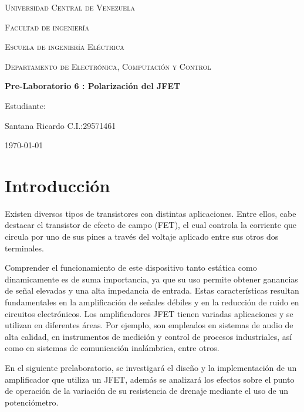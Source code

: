 \documentclass[12pt, a4paper]{article}
\begin{document}
    \begin{titlepage}
        \centering
        {\scshape\Large Universidad Central de Venezuela \par}
        {\scshape\Large Facultad de ingeniería \par}
        {\scshape\Large Escuela de ingeniería Eléctrica \par}
        {\scshape\Large Departamento de Electrónica, Computación y Control \par}

        \vspace{6cm}
        {\Large\bfseries Pre-Laboratorio 6 : Polarización del JFET\par}
        \vspace{6cm}

        \vfill
        \begin{flushright}
            Estudiante:\par
            Santana Ricardo C.I.:29571461 \par
            \vspace{1cm}  
        \end{flushright}
        \vfill
        {\large \today \par}
    \end{titlepage}

    \section{Introducción}

    Existen diversos tipos de transistores con distintas aplicaciones. Entre ellos, cabe destacar el transistor de efecto de campo (FET), el cual controla la corriente que circula por uno de sus pines a través del voltaje aplicado entre sus otros dos terminales.
    
    Comprender el funcionamiento de este dispositivo tanto estática como dinamicamente es de suma importancia, ya que su uso permite obtener ganancias de señal elevadas y una alta impedancia de entrada. Estas características resultan fundamentales en la amplificación de señales débiles y en la reducción de ruido en circuitos electrónicos. Los amplificadores JFET tienen variadas aplicaciones y se utilizan en diferentes áreas. Por ejemplo, son empleados en sistemas de audio de alta calidad, en instrumentos de medición y control de procesos industriales, así como en sistemas de comunicación inalámbrica, entre otros.

    En el siguiente prelaboratorio, se investigará el diseño y la implementación de un amplificador que utiliza un JFET, además se analizará los efectos sobre el punto de operación de la variación de su resistencia de drenaje mediante el uso de un potenciómetro.
\end{document}

